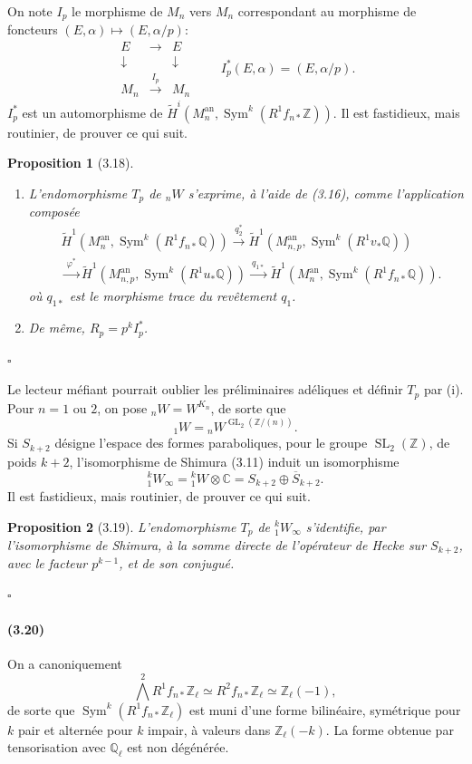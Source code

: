 \documentclass[10pt]{article}
\newcommand{\C}{\mathbb C}
\newcommand{\Q}{\mathbb Q}
\newcommand{\Z}{\mathbb Z}
\newcommand{\GL}{\operatorname{GL}}
\newcommand{\SL}{\operatorname{SL}}
\newcommand{\Sym}{\operatorname{Sym}}
\newcommand{\an}{\mathrm{an}}
\newcommand{\QED}{\hfill$\square$}
\newtheorem*{proposition}{Proposition}
\begin{document}
On note $I_p$ le morphisme de $M_n$ vers $M_n$ correspondant au morphisme de foncteurs $(E,\alpha)\mapsto(E,\alpha/p)$:
\[
\begin{array}{ccc}
E&\longrightarrow&E\\
\downarrow&&\downarrow\\
M_n&\xrightarrow{\ I_p\ }&M_n
\end{array}
\qquad
I_p^*(E,\alpha)=(E,\alpha/p).
\tag{3.17}
\]
$I_p^*$ est un automorphisme de $\widetilde H^i(M_n^{\an},\Sym^k(R^1f_{n*}\Z))$. Il est fastidieux, mais routinier, de prouver ce qui suit.

\begin{proposition}[3.18]
\leavevmode
\begin{enumerate}[label=(\roman*)]
\item L'endomorphisme $T_p$ de ${}_nW$ s'exprime, à l'aide de (3.16), comme l'application composée
\[
\begin{aligned}
&\widetilde H^1(M_n^{\an},\Sym^k(R^1f_{n*}\Q))
\xrightarrow{\ q_2^*\ }
\widetilde H^1(M_{n,p}^{\an},\Sym^k(R^1v_*\Q))\\
&\xrightarrow{\ \varphi^*\ }
\widetilde H^1(M_{n,p}^{\an},\Sym^k(R^1u_*\Q))
\xrightarrow{\ q_{1*}\ }
\widetilde H^1(M_n^{\an},\Sym^k(R^1f_{n*}\Q)).
\end{aligned}
\]
où $q_{1*}$ est le morphisme trace du revêtement $q_1$.
\item De même, $R_p=p^kI_p^*$.
\end{enumerate}
\end{proposition}
\QED

Le lecteur méfiant pourrait oublier les préliminaires adéliques et définir $T_p$ par (i). Pour $n=1$ ou $2$, on pose ${}_nW=W^{K_n}$, de sorte que
\[
{}_1W={}_nW^{\GL_2(\Z/(n))}.
\]
Si $S_{k+2}$ désigne l'espace des formes paraboliques, pour le groupe $\SL_2(\Z)$, de poids $k+2$, l'isomorphisme de Shimura (3.11) induit un isomorphisme
\[
{}^k_1W_\infty={}^k_1W\otimes\C=S_{k+2}\oplus \overline{S}_{k+2}.
\]
Il est fastidieux, mais routinier, de prouver ce qui suit.

\begin{proposition}[3.19]
L'endomorphisme $T_p$ de ${}^k_1W_\infty$ s'identifie, par l'isomorphisme de Shimura, à la somme directe de l'opérateur de Hecke sur $S_{k+2}$, avec le facteur $p^{k-1}$, et de son conjugué.
\end{proposition}
\QED

\paragraph{(3.20)}
On a canoniquement
\[
\bigwedge^2R^1f_{n*}\Z_\ell\simeq R^2f_{n*}\Z_\ell\simeq \Z_\ell(-1),
\]
de sorte que $\Sym^k(R^1f_{n*}\Z_\ell)$ est muni d'une forme bilinéaire, symétrique pour $k$ pair et alternée pour $k$ impair, à valeurs dans $\Z_\ell(-k)$. La forme obtenue par tensorisation avec $\Q_\ell$ est non dégénérée.
\end{document}
